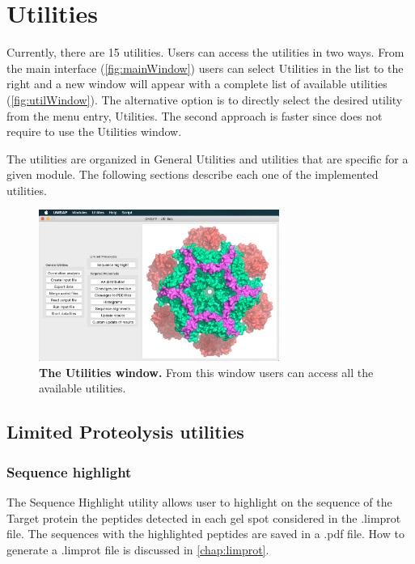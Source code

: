 \chapter{Utilities}
\label{chap:util}

Currently, there are \num{15} utilities. Users can access the utilities in two ways. From the main interface (\autoref{fig:mainWindow}) users can select Utilities in the list to the right and a new window will appear with a complete list of available utilities (\autoref{fig:utilWindow}). The alternative option is to directly select the desired utility from the menu entry, Utilities. The second approach is faster since does not require to use the Utilities window.

The utilities are organized in General Utilities and utilities that are specific for a given module. The following sections describe each one of the implemented utilities.

\begin{figure}[h]
	\centering
	\includegraphics[width=0.7\textwidth]{./IMAGES/UTIL-WINDOW/util.jpg}	    
	\caption[The Utilities window]{\textbf{The Utilities window.} From this window users can access all the available utilities.} 
	\label{fig:utilWindow}
	\vspace{-5pt} 	
\end{figure} 

\section{Limited Proteolysis utilities}

\subsection{Sequence highlight}
\label{subsec:utilSeqHigh}
The Sequence Highlight utility allows user to highlight on the sequence of the Target protein the peptides detected in each gel spot considered in the .limprot file. The sequences with the highlighted peptides are saved in a .pdf file. How to generate a .limprot file is discussed in \autoref{chap:limprot}.

